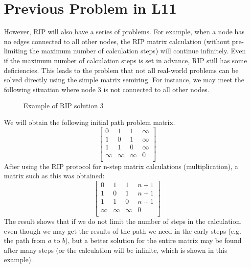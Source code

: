 \documentclass[a4paper,12pt,twoside,openright]{report}
\begin{document}
\section{Previous Problem in L11}
However, RIP will also have a series of problems. For example, when a node has no edges connected to all other nodes, the RIP matrix calculation (without pre-limiting the maximum number of calculation steps) will continue infinitely. Even if the maximum number of calculation steps is set in advance, RIP still has some deficiencies. 
This leads to the problem that not all real-world problems can be solved directly using the simple matrix semiring. 
For instance, we may meet the following situation where node 3 is not connected to all other nodes.
\begin{figure}[H]
\centering
{}
\label{example:rip:3}
\caption{Example of RIP solution 3}
\end{figure}
We will obtain the following initial path problem matrix.
\[
\begin{bmatrix}
    0 & 1 & 1 & \infty \\
    1 & 0 & 1 & \infty \\
    1 & 1 & 0 & \infty \\
    \infty & \infty & \infty & 0 \\
\end{bmatrix}
\]
After using the RIP protocol for n-step matrix calculations (multiplication), a matrix such as this was obtained:
\[
\begin{bmatrix}
    0 & 1 & 1 & n+1 \\
    1 & 0 & 1 & n+1 \\
    1 & 1 & 0 & n+1 \\
    \infty & \infty & \infty & 0 \\
\end{bmatrix}
\]
The result shows that if we do not limit the number of steps in the calculation, even though we may get the results of the path we need in the early steps (e.g. the path from $a$ to $b$), but a better solution for the entire matrix may be found after many steps (or the calculation will be infinite, which is shown in this example). 
\end{document}
